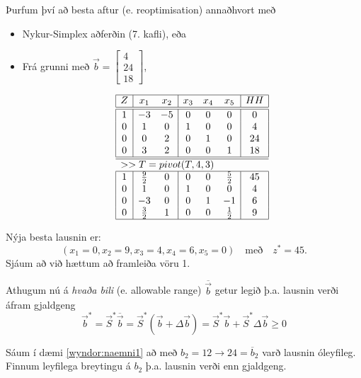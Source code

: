 \begin{lausn}
\begin{samepage}
Þurfum því að besta aftur (e. reoptimisation) annaðhvort með
\begin{itemize}
 \item Nykur-Simplex aðferðin (7. kafli), eða 
 \item Frá grunni með $\vec{b}=\begin{bmatrix}4\\24\\18\end{bmatrix}$, 
 \begin{center}
{\renewcommand{\arraystretch}{1.5} \renewcommand{\tabcolsep}{0.2cm}
{\scriptsize
\[\begin{array}{|c|cc|ccc|c|} \hline 
 Z &  x_1 &  x_2 & x_3 & x_4 & x_5 &  HH  \\ \hline\hline 
 1 &  -3 &  -5 &  0 &  0 &  0&  0 \\ 
 0 & 1 &  0 &  1 & 0 & 0 &  4 \\
 0 &  0 &  2 &  0 &   1 &   0 & 24 \\
 0 &  3 &  2 & 0 & 0 & 1 &  18 \\ 
\hline\hline \multicolumn{7}{l}{>> T = pivot(T,4,3)} \\ \hline 
 1 &  \frac{9}{2} & 0 & 0 & 0 & \frac{5}{2}& 45 \\ 
 0 &    1 & 0 & 1 & 0 & 0   & 4 \\ 
 0 &   -3 & 0 & 0 & 1 &-1   & 6 \\ 
 0 &  \frac{3}{2} & 1 & 0 & 0 & \frac{1}{2} & 9 \\ \hline 
\end{array}\]
}}\end{center} \end{itemize}\end{samepage}
Nýja besta lausnin er: $$(x_1=0,x_2=9,x_3=4,x_4=6,x_5=0) \quad\mbox{með}\quad z^*=45.$$ Sjáum að við hættum að framleiða vöru 1.
\end{lausn}
Athugum nú á \emph{hvaða bili} (e. allowable range) $\overline{\vec{b}}$ getur legið þ.a. lausnin verði áfram gjaldgeng
$$\vec{b}^*=\vec{S}^*\overline{\vec{b}}=\vec{S}^*(\vec{b}+\Delta\vec{b})=\vec{S}^*\vec{b}+\vec{S}^*\Delta\vec{b}\geq0$$
\begin{daemi}\label{wyndor:naemni2} Sáum í dæmi \ref{wyndor:naemni1} að með $b_2=12\rightarrow24=\overline{b}_2$ varð lausnin óleyfileg. Finnum leyfilega breytingu á $b_2$ þ.a. lausnin verði enn gjaldgeng. 
\end{daemi}
